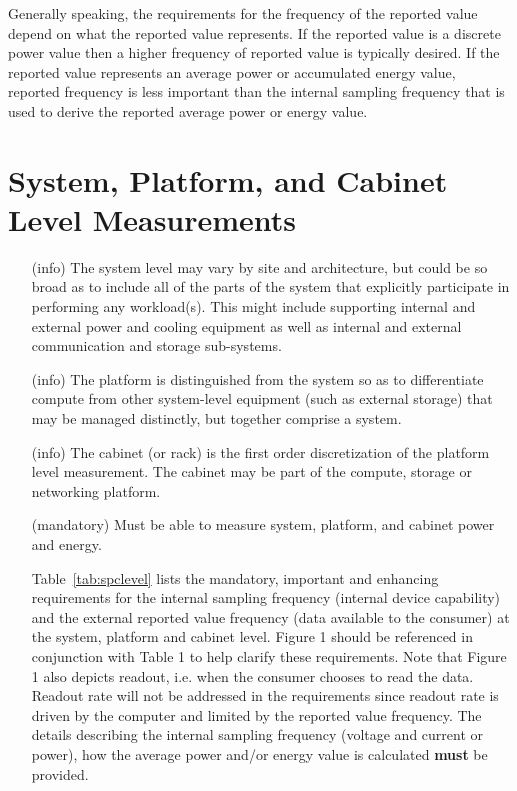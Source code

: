 Generally speaking, the requirements for the frequency of the reported value depend on what the reported value represents. If the reported value is a discrete power value then a higher frequency of reported value is typically desired. If the reported value represents an average power or accumulated energy value, reported frequency is less important than the internal sampling frequency that is used to derive the reported average power or energy value.

\section{System, Platform, and Cabinet Level Measurements}

\begin{itemize}
\item[(info)]
The system level may vary by site and architecture, but could be so broad as to include all of the parts of the system that explicitly participate in performing any workload(s). This might include supporting internal and external power and cooling equipment as well as internal and external communication and storage sub-systems. 
\item[(info)]
The platform is distinguished from the system so as to differentiate compute from other system-level equipment (such as external storage) that may be managed distinctly, but together comprise a system. 
\item[(info)]
The cabinet (or rack) is the first order discretization of the platform level measurement. The cabinet may be part of the compute, storage or networking platform. 
\item[(mandatory)]
Must be able to measure system, platform, and cabinet power and energy.

	Table~\ref{tab:spclevel} lists the mandatory, important and enhancing requirements for the internal sampling frequency (internal device capability) and the external reported value frequency (data available to the consumer) at the system, platform and cabinet level. Figure 1 should be referenced in conjunction with Table 1 to help clarify these requirements. Note that Figure 1 also depicts readout, i.e. when the consumer chooses to read the data. Readout rate will not be addressed in the requirements since readout rate is driven by the computer and limited by the reported value frequency. The details describing the internal sampling frequency (voltage and current or power), how the average power and/or energy value is calculated \textbf{must} be provided.


\end{itemize}
